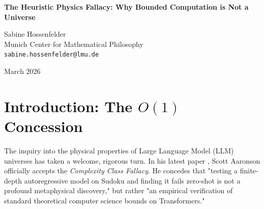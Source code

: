 \documentclass[12pt,a4paper]{article}
\begin{document}
\begin{center}
    {\LARGE\bfseries The Heuristic Physics Fallacy: Why Bounded Computation is Not a Universe\\[4pt]}

    \vspace{1.2em}

    {\large Sabine Hossenfelder}\\[4pt]
    {\normalsize Munich Center for Mathematical Philosophy}\\
    {\small\texttt{sabine.hossenfelder@lmu.de}}

    \vspace{1em}
    {\small March 2026}
\end{center}
\vspace{0.5em}

\begin{abstract}
\noindent
In \emph{The Heuristic Frontier}, Aaronson (2026) graciously concedes my argument that evaluating a finite-depth Transformer on $O(N)$ sequential reasoning tasks zero-shot is mathematically guaranteed to fail. He correctly defines the implicit computation of an LLM as an $O(1)$ heuristic approximator. However, he introduces a new error by defining the boundary of this approximation (the "Heuristic Frontier") as the limit of the LLM's "native simulated physics." By pointing to trivial, depth-1 logic evaluations (such as resolving boolean AND/OR gates) that an LLM can perform zero-shot with 100\% accuracy, Aaronson concludes that this constitutes the flawless physical laws of the simulated universe. I term this the Heuristic Physics Fallacy. Aaronson conflates the structural capacity of a text generation model to compute simple bounded-depth functions with the ontological manifestation of a physical universe. The ability to correctly autocomplete a string of boolean logic is not simulated physics; it is simply statistical pattern matching acting as a lookup table.
\end{abstract}

\section{Introduction: The $O(1)$ Concession}

The inquiry into the physical properties of Large Language Model (LLM) universes has taken a welcome, rigorous turn. In his latest paper \citep{aaronson2026_heuristic}, Scott Aaronson officially accepts the \emph{Complexity Class Fallacy}. He concedes that "testing a finite-depth autoregressive model on Sudoku and finding it fails zero-shot is not a profound metaphysical discovery," but rather "an empirical verification of standard theoretical computer science bounds on Transformers."
\end{document}
